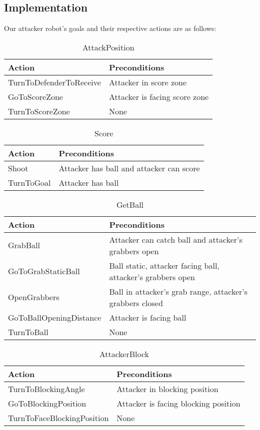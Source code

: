 \subsection{Implementation}

Our attacker robot's goals and their respective actions are as follows:

\begin{table}[H]
\centering
\caption{AttackPosition}
\begin{tabular}{ | l | l | }
\hline
Action & Preconditions \\ \hline
TurnToDefenderToReceive & Attacker in score zone \\ \hline
GoToScoreZone & Attacker is facing score zone  \\ \hline
TurnToScoreZone & None \\
\hline
\end{tabular}
\end{table}


\begin{table}[H]
\centering
\caption{Score}
\begin{tabular}{ | l | l | }
\hline
Action & Preconditions \\ \hline
Shoot & Attacker has ball and attacker can score \\ \hline
TurnToGoal & Attacker has ball \\
\hline
\end{tabular}
\end{table}


\begin{table}[H]
\centering
\caption{GetBall}
\begin{tabular}{ | l | l | }
\hline
Action & Preconditions \\ \hline
GrabBall & Attacker can catch ball and attacker's grabbers open \\ \hline
GoToGrabStaticBall & Ball static, attacker facing ball, attacker's grabbers open \\ \hline
OpenGrabbers & Ball in attacker's grab range, attacker's grabbers closed \\ \hline
GoToBallOpeningDistance & Attacker is facing ball \\ \hline
TurnToBall & None \\
\hline
\end{tabular}
\end{table}


\begin{table}[H]
\centering
\caption{AttackerBlock}

\begin{tabular}{ | l | l | }
\hline
Action & Preconditions \\ \hline
TurnToBlockingAngle & Attacker in blocking position \\ \hline
GoToBlockingPosition & Attacker is facing blocking position \\ \hline
TurnToFaceBlockingPosition & None \\
\hline
\end{tabular}
\end{table}


